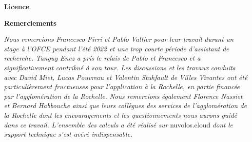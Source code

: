 \documentclass[
  10pt,
  a4paper,
  numbers=noendperiod,
  DIV=9]{scrartcl}
\begin{document}
\begin{tcolorbox}[enhanced jigsaw, opacityback=0, rightrule=.15mm, breakable, colframe=quarto-callout-note-color-frame, left=2mm, toprule=.15mm, bottomrule=.15mm, arc=.35mm, colback=white, leftrule=.75mm]

\textbf{Licence}\vspace{2mm}

\end{tcolorbox}

\begin{tcolorbox}[enhanced jigsaw, opacityback=0, rightrule=.15mm, breakable, colframe=quarto-callout-note-color-frame, left=2mm, toprule=.15mm, bottomrule=.15mm, arc=.35mm, colback=white, leftrule=.75mm]

\textbf{Remerciements}\vspace{2mm}

\emph{Nous remercions Francesco Pirri et Pablo Vallier pour leur travail
durant un stage à l'OFCE pendant l'été 2022 et une trop courte période
d'assistant de recherche. Tanguy Enez a pris le relais de Pablo et
Francesco et a significativement contribué à son tour. Les discussions
et les travaux conduits avec David Miet, Lucas Pouvreau et Valentin
Stuhfault de Villes Vivantes ont été particulièrement fructueuses pour
l'application à la Rochelle, en partie financée par l'agglomération de
la Rochelle. Nous remercions également Florence Nassiet et Bernard
Habbouche ainsi que leurs collègues des services de l'agglomération de
la Rochelle dont les encouragements et les questionnements nous aurons
guidé dans ce travail. L'ensemble des calculs a été réalisé sur}
nuvolos.cloud \emph{dont le support technique s'est avéré
indispensable.}

\end{tcolorbox}
\end{document}
